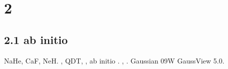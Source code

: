 \documentclass[a4paper]{article}
\begin{document}
\clearpage\section{{\CYRG}{\cyrl}{\cyra}{\cyrv}{\cyra} 2 {\CYRR}{\cyra}{\cyrs}{\cyrch}{\cyre}{\cyrt}
{\cyrs}{\cyri}{\cyrl} {\cyro}{\cyrs}{\cyrc}{\cyri}{\cyrl}{\cyrl}{\cyrya}{\cyrt}{\cyro}{\cyrr}{\cyro}{\cyrv}}
\hypertarget{RefHeading4695463868395}{}\subsection[2.1 {\CYRR}{\cyra}{\cyrs}{\cyrch}{\cyre}{\cyrt}{\cyrery} ab
initio]{2.1 {\CYRR}{\cyra}{\cyrs}{\cyrch}{\cyre}{\cyrt}{\cyrery} \foreignlanguage{english}{ab}
\foreignlanguage{english}{initio}}
\hypertarget{RefHeading4697463868395}{}{\CYRV} {\cyrr}{\cyra}{\cyrb}{\cyro}{\cyrt}{\cyre} {\cyrm}{\cyrery}
{\cyrp}{\cyrl}{\cyra}{\cyrn}{\cyri}{\cyrr}{\cyru}{\cyre}{\cyrm}
{\cyri}{\cyrs}{\cyrs}{\cyrl}{\cyre}{\cyrd}{\cyro}{\cyrv}{\cyra}{\cyrt}{\cyrsftsn}
{\cyrm}{\cyro}{\cyrl}{\cyre}{\cyrk}{\cyru}{\cyrl}{\cyrery} \foreignlanguage{english}{NaHe},
\foreignlanguage{english}{CaF}, \foreignlanguage{english}{NeH}. {\CYRCH}{\cyra}{\cyrs}{\cyrt}{\cyrsftsn}
{\cyrp}{\cyra}{\cyrr}{\cyra}{\cyrm}{\cyre}{\cyrt}{\cyrr}{\cyro}{\cyrv},
{\cyrk}{\cyro}{\cyrt}{\cyro}{\cyrr}{\cyrery}{\cyre} {\cyrn}{\cyra}{\cyrm}
{\cyrn}{\cyre}{\cyro}{\cyrb}{\cyrh}{\cyro}{\cyrd}{\cyri}{\cyrm}{\cyrery} {\cyrd}{\cyrl}{\cyrya}
{\cyri}{\cyrs}{\cyrp}{\cyro}{\cyrl}{\cyrsftsn}{\cyrz}{\cyro}{\cyrv}{\cyra}{\cyrn}{\cyri}{\cyrya}
{\cyrm}{\cyre}{\cyrt}{\cyro}{\cyrd}{\cyra} \foreignlanguage{english}{QDT}, {\cyrm}{\cyrery}
{\cyrm}{\cyro}{\cyrzh}{\cyre}{\cyrm} {\cyru}{\cyrz}{\cyrn}{\cyra}{\cyrt}{\cyrsftsn},
{\cyrp}{\cyrr}{\cyro}{\cyri}{\cyrz}{\cyrv}{\cyre}{\cyrd}{\cyrya}
{\cyrk}{\cyro}{\cyrm}{\cyrp}{\cyrsftsn}{\cyryu}{\cyrt}{\cyre}{\cyrr}{\cyrn}{\cyrery}{\cyrishrt}
{\cyrr}{\cyra}{\cyrs}{\cyrch}{\cyre}{\cyrt} \foreignlanguage{english}{ab} \foreignlanguage{english}{initio}
{\cyro}{\cyrs}{\cyrn}{\cyro}{\cyrv}{\cyrn}{\cyro}{\cyrg}{\cyro}
{\cyrs}{\cyro}{\cyrs}{\cyrt}{\cyro}{\cyrya}{\cyrn}{\cyri}{\cyrya} {\cyri}{\cyro}{\cyrn}{\cyro}{\cyrv}
{\cyrs}{\cyro}{\cyro}{\cyrt}{\cyrv}{\cyre}{\cyrt}{\cyrs}{\cyrt}{\cyrv}{\cyru}{\cyryu}{\cyrshch}{\cyri}{\cyrh}
{\cyrm}{\cyro}{\cyrl}{\cyre}{\cyrk}{\cyru}{\cyrl}. {\CYRT}{\cyra}{\cyrk}{\cyri}{\cyrm}{\cyri}
{\cyrp}{\cyra}{\cyrr}{\cyra}{\cyrm}{\cyre}{\cyrt}{\cyrr}{\cyra}{\cyrm}{\cyri}
{\cyrya}{\cyrv}{\cyrl}{\cyrya}{\cyryu}{\cyrt}{\cyrs}{\cyrya}
{\cyrv}{\cyrr}{\cyra}{\cyrshch}{\cyra}{\cyrt}{\cyre}{\cyrl}{\cyrsftsn}{\cyrn}{\cyrery}{\cyre}
{\cyrk}{\cyro}{\cyrn}{\cyrs}{\cyrt}{\cyra}{\cyrn}{\cyrt}{\cyrery},
{\cyrd}{\cyri}{\cyrp}{\cyro}{\cyrl}{\cyrsftsn}{\cyrn}{\cyrery}{\cyre} {\cyri}
{\cyrk}{\cyrv}{\cyra}{\cyrd}{\cyrr}{\cyru}{\cyrp}{\cyro}{\cyrl}{\cyrsftsn}{\cyrn}{\cyrery}{\cyre}
{\cyrm}{\cyro}{\cyrm}{\cyre}{\cyrn}{\cyrt}{\cyrery}. {\CYRB}{\cyru}{\cyrd}{\cyre}{\cyrm}
{\cyri}{\cyrs}{\cyrp}{\cyro}{\cyrl}{\cyrsftsn}{\cyrz}{\cyro}{\cyrv}{\cyra}{\cyrt}{\cyrsftsn} {\cyrd}{\cyrl}{\cyrya}
{\cyrerev}{\cyrt}{\cyro}{\cyrg}{\cyro} {\cyrp}{\cyrr}{\cyro}{\cyrg}{\cyrr}{\cyra}{\cyrm}{\cyrm}{\cyrery}
\foreignlanguage{english}{Gaussian} 09\foreignlanguage{english}{W} {\cyri} \foreignlanguage{english}{GaussView} 5.0.
\end{document}
